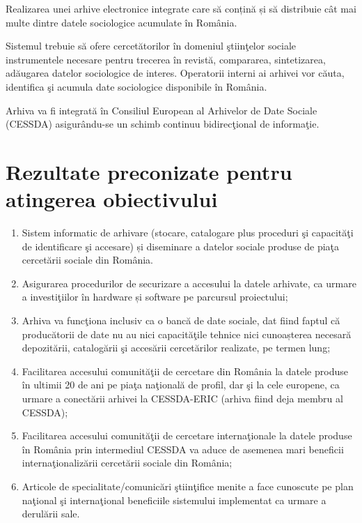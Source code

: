 \documentclass[a4paper, 10pt]{article}
\begin{document}
{{
\foreignlanguage{english}{Realizarea }\foreignlanguage{romanian}{unei arhive electronice integrate care s\u{a}
con\c{t}in\u{a} \c{s}i s\u{a} distribuie c\^at mai multe dintre datele sociologice acumulate \^in Rom\^ania.}}

\medskip

Sistemul trebuie s\u{a} ofere cercet\u{a}torilor \^in domeniul \c{s}tiin\c{t}elor sociale instrumentele necesare pentru
trecerea \^in revist\u{a}, compararea, sintetizarea, ad\u{a}ugarea datelor sociologice de interes. Operatorii interni
ai arhivei vor c\u{a}uta, identifica \c{s}i acumula date sociologice disponibile \^in Rom\^ania.

\medskip

Arhiva va fi integrat\u{a} \^in Consiliul European al Arhivelor de Date Sociale (CESSDA) asigur\^andu-se un schimb
continuu bidirec\c{t}ional de informa\c{t}ie.

\section{Rezultate preconizate pentru atingerea obiectivului}

\begin{enumerate}
\item {
Sistem informatic de arhivare (stocare, catalogare plus proceduri \c{s}i capacit\u{a}\c{t}i de identificare \c{s}i
accesare) \foreignlanguage{romanian}{\c{s}}i diseminare a datelor sociale produse de pia\c{t}a cercet\u{a}rii sociale
din Rom\^ania.}
\item {
Asigurarea procedurilor de securizare a accesului la datele arhivate, ca urmare a investi\c{t}iilor \^in hardware
\foreignlanguage{romanian}{\c{s}}i software pe parcursul proiectului;}
\item {
\foreignlanguage{romanian}{Arhiva }va func\c{t}iona inclusiv ca o banc\u{a} de date sociale, dat fiind faptul c\u{a}
produc\u{a}torii de date nu au nici capacit\u{a}\c{t}ile tehnice nici \foreignlanguage{romanian}{cunoa\c{s}terea}
necesar\u{a} depozit\u{a}rii, catalog\u{a}rii \c{s}i acces\u{a}rii cercet\u{a}rilor realizate, pe termen lung;}
\item {
Facilitarea accesului comunit\u{a}\c{t}ii de cercetare din Rom\^ania la datele produse \^in ultimii 20 de ani pe
pia\c{t}a na\c{t}ional\u{a} de profil, dar \c{s}i la cele europene, ca urmare a conect\u{a}rii arhivei la CESSDA-ERIC
(arhiva fiind deja membru al CESSDA);}
\item {
Facilitarea accesului comunit\u{a}\c{t}ii de cercetare interna\c{t}ionale la datele produse \^in Rom\^ania prin
intermediul CESSDA va aduce de asemenea mari beneficii interna\c{t}ionaliz\u{a}rii cercet\u{a}rii sociale din
Rom\^ania;}
\item {
Articole de specialitate/comunic\u{a}ri \c{s}tiin\c{t}ifice menite a face cunoscute pe plan na\c{t}ional \c{s}i
interna\c{t}ional beneficiile sistemului implementat ca urmare a derul\u{a}rii sale.}
\end{enumerate}

}
\end{document}
